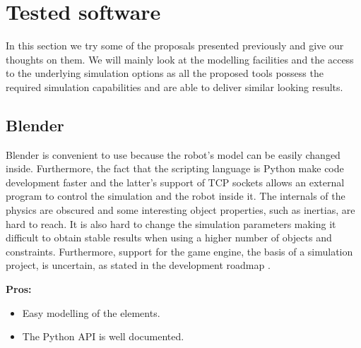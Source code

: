 %
%
%
%

\section{Tested software}
In this section we try some of the proposals presented previously and give our thoughts on them. We will mainly look at the modelling facilities and the access to the underlying simulation options as all the proposed tools possess the required simulation capabilities and are able to deliver similar looking results.

\subsection{Blender}
Blender is convenient to use because the robot's model can be easily changed inside. Furthermore, the fact that the scripting language is Python make code development faster and the latter's support of TCP sockets allows an external program to control the simulation and the robot inside it. The internals of the physics are obscured and some interesting object properties, such as inertias, are hard to reach. It is also hard to change the simulation parameters making it difficult to obtain stable results when using a higher number of objects and constraints. Furthermore, support for the game engine, the basis of a simulation project, is uncertain, as stated in the development roadmap \cite{blender_roadmap}.

\textbf{Pros:}
\begin{itemize}
\item Easy modelling of the elements.
\item The Python API is well documented.
\end{itemize}

